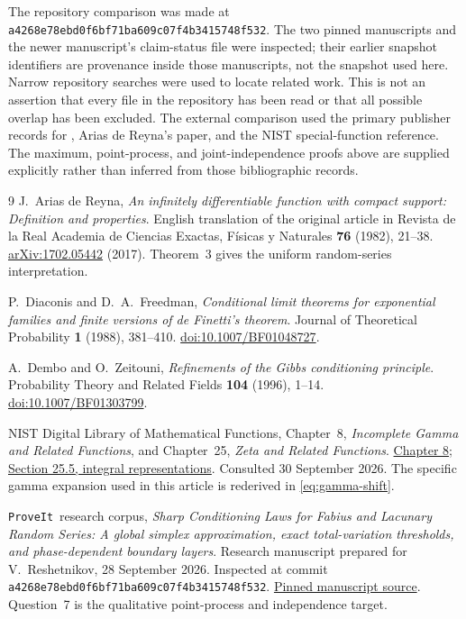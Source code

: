 \documentclass[11pt,a4paper]{article}
\numberwithin{equation}{section}
\theoremstyle{definition}
\theoremstyle{remark}
\newcommand{\repo}{\texttt{ProveIt}}
\newcommand{\commit}{\texttt{a4268e78ebd0f6bf71ba609c07f4b3415748f532}}
\begin{document}
The repository comparison was made at \commit. The two pinned
manuscripts and the newer manuscript's claim-status file were
inspected; their earlier snapshot identifiers are provenance inside
those manuscripts, not the snapshot used here. Narrow repository
searches were used to locate related work. This is not an assertion
that every file in the repository has been read or that all possible
overlap has been excluded. The external comparison used the primary
publisher records for \cite{df,dz}, Arias de Reyna's paper, and the
NIST special-function reference. The maximum, point-process, and
joint-independence proofs above are supplied explicitly rather than
inferred from those bibliographic records.

\clearpage
\begin{thebibliography}{9}
J.~Arias de Reyna,
\emph{An infinitely differentiable function with compact support:
Definition and properties}.
English translation of the original article in
Revista de la Real Academia de Ciencias Exactas, F\'isicas y Naturales
\textbf{76} (1982), 21--38.
\href{https://arxiv.org/abs/1702.05442}{arXiv:1702.05442} (2017).
Theorem~3 gives the uniform random-series interpretation.

P.~Diaconis and D.~A.~Freedman,
\emph{Conditional limit theorems for exponential families and finite
versions of de Finetti's theorem}.
Journal of Theoretical Probability \textbf{1} (1988), 381--410.
\href{https://doi.org/10.1007/BF01048727}{doi:10.1007/BF01048727}.

A.~Dembo and O.~Zeitouni,
\emph{Refinements of the Gibbs conditioning principle}.
Probability Theory and Related Fields \textbf{104} (1996), 1--14.
\href{https://doi.org/10.1007/BF01303799}{doi:10.1007/BF01303799}.

NIST Digital Library of Mathematical Functions,
Chapter~8, \emph{Incomplete Gamma and Related Functions}, and
Chapter~25, \emph{Zeta and Related Functions}.
\href{https://dlmf.nist.gov/8}{Chapter 8};
\href{https://dlmf.nist.gov/25.5}{Section 25.5, integral representations}.
Consulted 30 September 2026. The specific gamma expansion used in this
article is rederived in \eqref{eq:gamma-shift}.

\repo\ research corpus,
\emph{Sharp Conditioning Laws for Fabius and Lacunary Random Series:
A global simplex approximation, exact total-variation thresholds,
and phase-dependent boundary layers}.
Research manuscript prepared for V.~Reshetnikov, 28 September 2026.
Inspected at commit \commit.
\href{https://github.com/VladimirReshetnikov/ProveIt/blob/a4268e78ebd0f6bf71ba609c07f4b3415748f532/Analysis/FabiusFunction/docs/semi-formalized-research-frontiers/drafts/representations/Sharp_Conditioning_Laws_Fabius_Lacunary_Series/article.tex}{Pinned manuscript source}.
Question~7 is the qualitative point-process and independence target.


\end{thebibliography}
\end{document}
